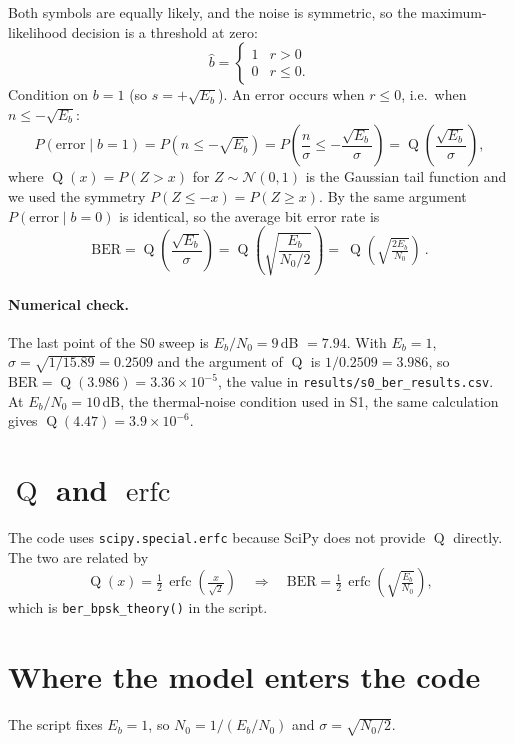 \documentclass[11pt,a4paper]{article}
\newcommand{\Q}{\operatorname{Q}}
\newcommand{\erfc}{\operatorname{erfc}}
\newcommand{\EbNo}{E_b/N_0}
\begin{document}
Both symbols are equally likely, and the noise is symmetric, so the
maximum-likelihood decision is a threshold at zero:
\[
  \hat b = \begin{cases} 1 & r>0 \\ 0 & r\le 0. \end{cases}
\]
Condition on $b=1$ (so $s=+\sqrt{E_b}$). An error occurs when $r\le 0$, i.e.\ when
$n \le -\sqrt{E_b}$:
\[
  P(\text{error}\mid b=1) = P\!\left(n\le-\sqrt{E_b}\right)
  = P\!\left(\frac{n}{\sigma} \le -\frac{\sqrt{E_b}}{\sigma}\right)
  = \Q\!\left(\frac{\sqrt{E_b}}{\sigma}\right),
\]
where $\Q(x) = P(Z > x)$ for $Z\sim\mathcal N(0,1)$ is the Gaussian tail function and we
used the symmetry $P(Z\le -x)=P(Z\ge x)$. By the same argument
$P(\text{error}\mid b=0)$ is identical, so the average bit error rate is
\begin{equation}
  \mathrm{BER} = \Q\!\left(\frac{\sqrt{E_b}}{\sigma}\right)
  = \Q\!\left(\sqrt{\frac{E_b}{N_0/2}}\right)
  = \boxed{\ \Q\!\left(\sqrt{\tfrac{2E_b}{N_0}}\right)\ }.
  \label{eq:ber}
\end{equation}

\paragraph{Numerical check.}
The last point of the S0 sweep is $\EbNo = 9$\,dB $=7.94$. With $E_b=1$,
$\sigma = \sqrt{1/15.89}=0.2509$ and the argument of $\Q$ is $1/0.2509 = 3.986$,
so $\mathrm{BER}=\Q(3.986) = 3.36\times10^{-5}$, the value in
\texttt{results/s0\_ber\_results.csv}. At $\EbNo=10$\,dB, the thermal-noise
condition used in S1, the same calculation gives $\Q(4.47)=3.9\times10^{-6}$.

\section{$\Q$ and $\erfc$}

The code uses \texttt{scipy.special.erfc} because SciPy does not provide $\Q$
directly. The two are related by
\[
  \Q(x) = \tfrac12\,\erfc\!\left(\tfrac{x}{\sqrt2}\right)
  \quad\Longrightarrow\quad
  \mathrm{BER} = \tfrac12\,\erfc\!\left(\sqrt{\tfrac{E_b}{N_0}}\right),
\]
which is \texttt{ber\_bpsk\_theory()} in the script.

\section{Where the model enters the code}

The script fixes $E_b = 1$, so $N_0 = 1/(\EbNo)$ and $\sigma = \sqrt{N_0/2}$.
\end{document}
